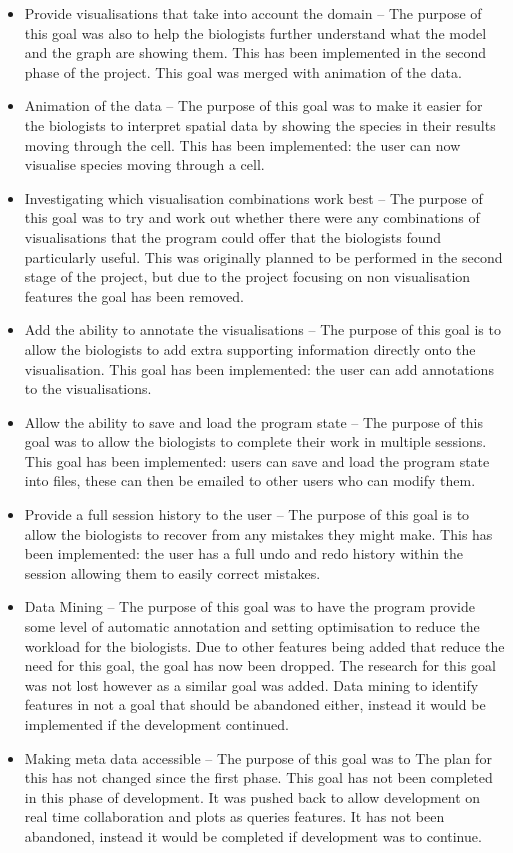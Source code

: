 \begin{itemize}
\item Provide visualisations that take into account the domain -- The purpose of this goal was also to help the biologists further understand what the model and the graph are showing them. This has been implemented in the second phase of the project.  This goal was merged with animation of the data.
\item Animation of the data -- The purpose of this goal was to make it easier for the biologists to interpret spatial data by showing the species in their results moving through the cell.  This has been implemented: the user can now visualise species moving through a cell.
\item Investigating which visualisation combinations work best -- The purpose of this goal was to try and work out whether there were any combinations of visualisations that the program could offer that the biologists found particularly useful.  This was originally planned to be performed in the second stage of the project, but due to the project focusing on non visualisation features the goal has been removed.
\item Add the ability to annotate the visualisations -- The purpose of this goal is to allow the biologists to add extra supporting information directly onto the visualisation. This goal has been implemented: the user can add annotations to the visualisations.
\item Allow the ability to save and load the program state -- The purpose of this goal was to allow the biologists to complete their work in multiple sessions. This goal has been implemented: users can save and load the program state into files, these can then be emailed to other users who can modify them.
\item Provide a full session history to the user -- The purpose of this goal is to allow the biologists to recover from any mistakes they might make. This has been implemented: the user has a full undo and redo history within the session allowing them to easily correct mistakes.
\item Data Mining -- The purpose of this goal was to have the program provide some level of automatic annotation and setting optimisation to reduce the workload for the biologists.  Due to other features being added that reduce the need for this goal, the goal has now been dropped.  The research for this goal was not lost however as a similar goal was added.  Data mining to identify features in not a goal that should be abandoned either, instead it would be implemented if the development continued.
\item Making meta data accessible -- The purpose of this goal was to The plan for this has not changed since the first phase.  This goal has not been completed in this phase of development.  It was pushed back to allow development on real time collaboration and plots as queries features.  It has not been abandoned, instead it would be completed if development was to continue.
\end{itemize}


